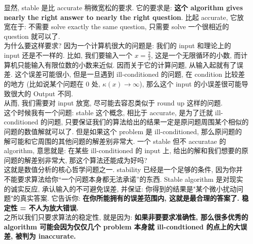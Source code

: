 \begin{remark}
  显然, stable 是比 accurate 稍微宽松的要求. 它的要求是: \textbf{这个 algorithm gives nearly the right answer to nearly the right question}. 比起 accurate, 它放宽在于: 不需要 solve exactly the same question, 只需要 solve 一个很相近的 question 就可以了.\\
  
为什么要这样要求? 因为一个计算机很大的问题是: 我们的 input 和理论上的 input 还是不一样的. 比如, 我们要输入一个 $x = \frac{2}{3}$, 这是一个无限循环的小数, 而计算机只能输入有限位数的小数来近似. 因而关于它的计算问题, 从输入起就有了误差. 这个误差可能很小, 但是一旦遇到 ill-conditioned 的问题, 在 condition 比较差的地方 (比如说某个问题在 $0$ 处, $\kappa(x) \to \infty$), 那么这个 input 的小误差很可能导致很大的 Output 不同.\\

从而, 我们需要对 input 放宽, 尽可能去容忍类似于 round up 这样的问题. \\

这个时候我有一个问题: stable 这个概念, 相比于 accurate, 是为了迁就 ill-conditioned 的问题, 只要保证我们的算法给出的结果一定是原问题周围某个相似的问题的数值解就可以了. 但是如果这个 problem 是 ill-conditioned, 那么原问题的解可能和它周围的其他问题的解差别非常大. 一个 stable 但不 accuratae 的 algorithm, 意思就是: 在某些 ill-conditioned 的 input 上, 给出的解和我们想要的原问题的解差别非常大, 那这个算法还能成为好吗?\\

这就是数值分析的核心哲学问题之一. stability 已经是一个足够的条件, 因为你并不能要求算法给你“一个问题本身都无法承诺”的东西. Stable algorithm 是对现实的诚实反应, 承认输入的不可避免误差, 并保证: 你得到的结果是"某个微小扰动问题"的真实答案. 它告诉你: \textbf{在你所能拥有的误差范围内, 这就是最合理的答案了. 稳定性 = 不人为放大错误.}\\ 
之所以我们只要求算法的稳定性, 就是因为: \textbf{如果非要要求准确性, 那么很多优秀的 algorithm 可能会因为仅仅几个 problem 本身就 ill-condtioned 的点上的大误差, 被判为 inaccurate. }  
\end{remark}

